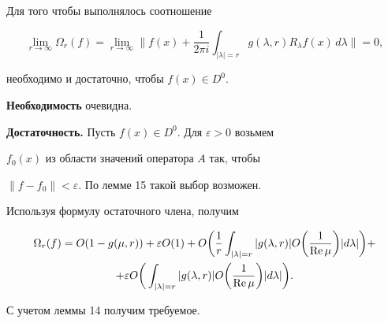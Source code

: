 \begin{thm}


Для того чтобы выполнялось соотношение


$$


\lim\limits_{r\to\infty}\Omega _r(f)=\lim\limits_{r\to\infty}


\bigg\|f(x)+\frac 1{2\pi i}\int_{|\lambda|=r}g(\lambda ,r)


R_\lambda f(x)\,d\lambda\bigg\| =0,


$$


необходимо и достаточно, чтобы $f(x)\in D^0$.


\end{thm}





\begin{pf} {\bf Необходимость} очевидна.


\smallskip





{\bf Достаточность.} Пусть $f(x)\in D^0.$ Для $\varepsilon >0$ возьмем


$f_0(x)$ из области значений оператора $A$ так, чтобы


$\|f-f_0\|<\varepsilon$. По лемме 15 такой выбор возможен.


Используя формулу остаточного члена, получим


\begin{multline*}


\Omega _r(f)=O(1-g(\mu ,r))+\varepsilon O(1)+


O\bigg(\frac 1r\int_{|\lambda|=r}|g(\lambda,r)


|O\bigg(\frac 1{{\RE}\,\mu}\bigg)|d\lambda|\bigg)+ \\


+\varepsilon O\bigg(\int_{|\lambda|=r}|g(\lambda ,r)|


O\bigg(\frac 1{{\RE}\,\mu}\bigg)|d\lambda|\bigg).


\end{multline*}


С учетом леммы 14 получим требуемое.


\end{pf}





